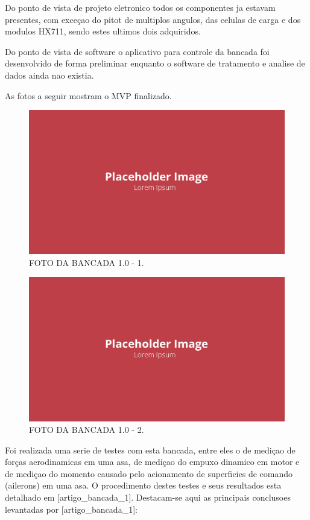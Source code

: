 Do ponto de vista de projeto eletronico todos os componentes ja estavam presentes, com exceçao do pitot de multiplos angulos, das celulas de carga e dos modulos HX711, sendo estes ultimos dois adquiridos.

Do ponto de vista de software o aplicativo para controle da bancada foi desenvolvido de forma preliminar enquanto o software de tratamento e analise de dados ainda nao existia.

As fotos a seguir mostram o MVP finalizado.

\begin{figure}[!ht]
    \centering
    \includegraphics[width=.8\linewidth]{figuras/placeholder.png}
    \caption{FOTO DA BANCADA 1.0 - 1\cite{autor}.}
    \label{fig:placeholder}
\end{figure}

\begin{figure}[!ht]
    \centering
    \includegraphics[width=.8\linewidth]{figuras/placeholder.png}
    \caption{FOTO DA BANCADA 1.0 - 2\cite{autor}.}
    \label{fig:placeholder}
\end{figure}

Foi realizada uma serie de testes com esta bancada, entre eles o de mediçao de forças aerodinamicas em uma asa, de mediçao do empuxo dinamico em motor e de mediçao do momento causado pelo acionamento de superficies de comando (ailerons) em uma asa. O procedimento destes testes e seus resultados esta detalhado em [artigo_bancada_1]. Destacam-se aqui as principais conclusoes levantadas por [artigo_bancada_1]:

